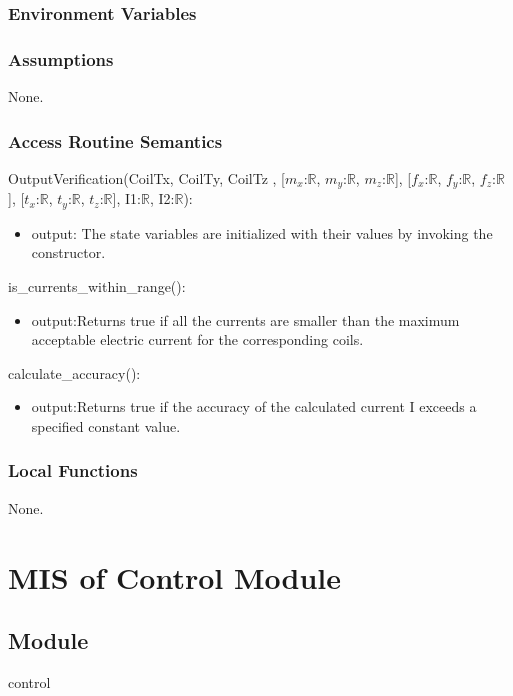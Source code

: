 \documentclass[12pt, titlepage]{article}
\begin{document}
\subsubsection{Environment Variables}

\subsubsection{Assumptions}
None.

\subsubsection{Access Routine Semantics}
\noindent OutputVerification(CoilTx,  CoilTy,  CoilTz , [$m_x$:$\mathbb{R}$, $m_y$:$\mathbb{R}$, $m_z$:$\mathbb{R}$], [$f_x$:$\mathbb{R}$, $f_y$:$\mathbb{R}$, $f_z$:$\mathbb{R}$], [$t_x$:$\mathbb{R}$, $t_y$:$\mathbb{R}$, $t_z$:$\mathbb{R}$], I1:$\mathbb{R}$, I2:$\mathbb{R}$):
\begin{itemize}
\item output: The state variables are initialized with their values by invoking the constructor.
\end{itemize}

\noindent is\_currents\_within\_range():
\begin{itemize}
\item output:Returns true if all the currents are smaller than the maximum acceptable electric current for the corresponding coils.
\end{itemize}

\noindent calculate\_accuracy():
\begin{itemize}
\item output:Returns true if the accuracy of the calculated current I exceeds a specified constant value.
\end{itemize}
\subsubsection{Local Functions}
None.


\section{MIS of Control Module} \label{Mc}

\subsection{Module}
control
\end{document}
